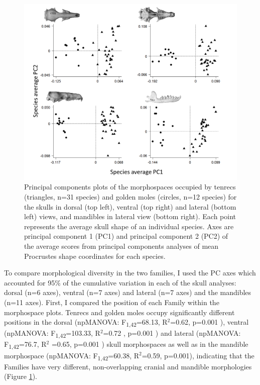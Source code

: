 	
	\begin{figure}[!htbp]
	\centering
	\includegraphics[width=1\linewidth, height=1\textheight, keepaspectratio]{Disparity/writing/figures/FourPCA_shapes.png}
	\caption[Morphospace (principal components) plot of morphological diversity in tenrec and golden mole skulls.]
		{Principal components plots of the morphospaces occupied by tenrecs (triangles, n=31 species) and golden moles (circles, n=12 species) for the skulls in dorsal (top left), ventral (top right) and lateral (bottom left) views, and mandibles in lateral view (bottom right). Each point represents the average skull shape of an individual species. Axes are principal component 1 (PC1) and principal component 2 (PC2) of the average scores from principal components analyses of mean Procrustes shape coordinates for each species.}
	\label{fig:FourPCA}
	\end{figure}

	To compare morphological diversity in the two families, I used the PC axes which accounted for 95\% of the cumulative variation in each of the skull analyses: dorsal (n=6 axes), ventral (n=7 axes) and lateral (n=7 axes) and the mandibles (n=11 axes). First, I compared the position of each Family within the morphospace plots. Tenrecs and golden moles occupy significantly different positions in the dorsal (npMANOVA: F\textsubscript{1,42}=68.13, R$^2$=0.62, p=0.001 ), ventral (npMANOVA: F\textsubscript{1,42}=103.33, R$^2$=0.72 , p=0.001 ) and lateral (npMANOVA: F\textsubscript{1,42}=76.7, R$^2$ =0.65, p=0.001 ) skull morphospaces as well as in the mandible morphospace (npMANOVA: F\textsubscript{1,42}=60.38, R$^2$=0.59, p=0.001),  indicating that the Families have very different, non-overlapping cranial and mandible morphologies (Figure \ref{fig:FourPCA}). 


